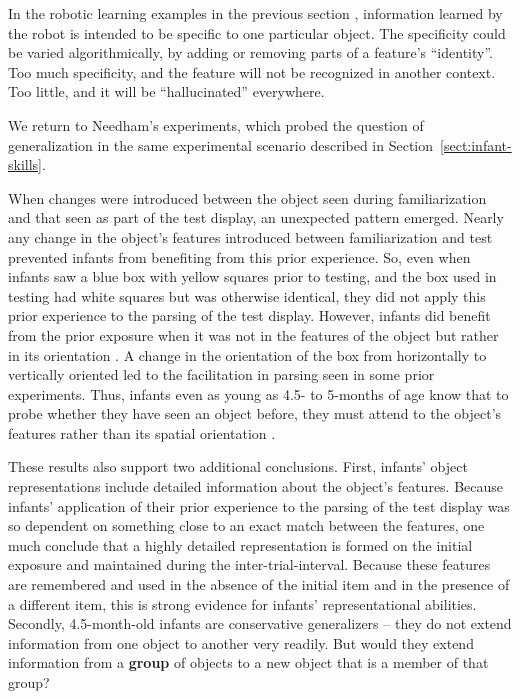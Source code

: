 %
In the robotic learning examples in 
the previous section \cite{fitzpatrick03object,natale05exploring},
information learned by the robot is intended to be specific to one particular
object.  The specificity could be varied algorithmically,
by adding or removing parts of a feature's ``identity''.
Too much specificity, and the feature will not be recognized
in another context.  Too little, and it will be ``hallucinated''
everywhere.
%
%
%

We return to 
Needham's experiments, which probed the question of
generalization in the same
experimental scenario described in Section~\ref{sect:infant-skills}.

When changes were introduced between the object seen during
familiarization and that seen as part of the test display, an
unexpected pattern emerged.  Nearly any change in the object's
features introduced between familiarization and test prevented infants
from benefiting from this prior experience.  So, even when infants
saw a blue box with yellow squares prior to testing, and the box used
in testing had white squares but was otherwise identical, they did not
apply this prior experience to the parsing of the test display.
However, infants did benefit from the prior exposure when it was not
in the features of the object but rather in its orientation 
 \cite{needham01object}.  
A change in the orientation of the box from horizontally to
vertically oriented led to the facilitation in parsing seen in some
prior experiments.  Thus, infants even as young as 4.5- to 5-months of
age know that to probe whether they have seen an object before, they
must attend to the object's features rather than its spatial
orientation \cite{needham01object}.

These results also support two additional conclusions.  First,
infants' object representations include detailed information
about the object's features.  Because infants'
application of their prior experience to the parsing of the test
display was so dependent on something close to an exact match between
the features, one much conclude that a highly detailed representation
is formed on the initial exposure and maintained during the
inter-trial-interval.  Because these features are remembered and used
in the absence of the initial item and in the presence of a different
item, this is strong evidence for infants' representational
abilities.  Secondly, 4.5-month-old infants are conservative
generalizers -- they do not extend information from one object to
another very readily.  But would they extend information from a {\bf group}
of objects to a new object that is a member of that group?


